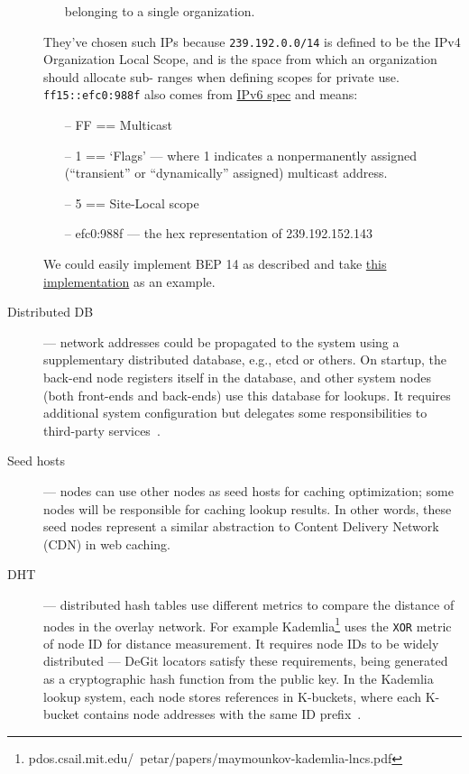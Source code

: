 \documentclass[acmlarge, screen, nonacm, 11pt]{acmart}
\newcommand{\code}[1]{\texttt{#1}}
\begin{document}
\begin{description}
\begin{itemize}
      belonging to a single organization.
    \end{itemize}
    They've chosen such IPs because \code{239.192.0.0/14} is defined to be the IPv4 Organization Local Scope,
    and is the space from which an organization should allocate sub-
    ranges when defining scopes for private use.
    \code{ff15::efc0:988f} also comes from \href{http://tools.ietf.org/html/rfc4291#section-2.7}{IPv6 spec} and means:
    \begin{itemize}
      \item[--] FF == Multicast
      \item[--] 1 == ‘Flags' --- where 1 indicates a nonpermanently assigned
        (``transient'' or ``dynamically'' assigned) multicast address.
      \item[--] 5 == Site-Local scope
      \item[--] efc0:988f --- the hex representation of 239.192.152.143
    \end{itemize}
    We could easily implement BEP 14 as described and take \href{https://github.com/transmission/transmission/blob/7f147c65fb07a6baed3d079703ff0a31d1b1ca4c/libtransmission/tr-lpd.c}{this implementation} as an example.
  \item[Distributed DB] --- network addresses could be propagated to the system using a supplementary distributed
    database, e.g., etcd or others. On startup, the back-end node registers itself in the database,
    and other system nodes (both front-ends and back-ends) use this database for lookups. 
    It requires additional system configuration but delegates some responsibilities to third-party services~\cite{distributed_key-value_database}.
  \item[Seed hosts] --- nodes can use other nodes as seed hosts for caching optimization; some nodes
    will be responsible for caching lookup results. In other words, these seed nodes represent a similar abstraction
    to Content Delivery Network (CDN) in web caching.
  \item[DHT] --- distributed hash tables use different metrics to compare the distance of nodes in the overlay network.
    For example Kademlia\footnote{pdos.csail.mit.edu/~petar/papers/maymounkov-kademlia-lncs.pdf} uses the
    \code{XOR} metric of node ID for distance measurement. It requires node IDs to be widely distributed ---
    DeGit locators satisfy these requirements, being generated as a cryptographic hash function from
    the public key. In the Kademlia lookup system, each node stores references in K-buckets, where each K-bucket
    contains node addresses with the same ID prefix~\cite{Kademlia_and_Chord_algorithm}.
\end{description}
\end{document}
